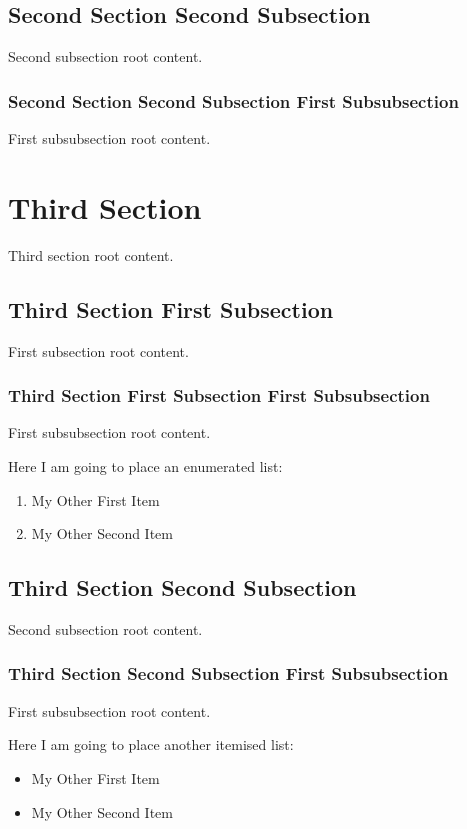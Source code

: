 \documentclass[12pt,twocolumn,a4paper,twoside]{article}
\begin{document}
\subsection{Second Section Second Subsection}
Second subsection root content.
\subsubsection{Second Section Second Subsection First Subsubsection}
First subsubsection root content.
\section{Third Section}
Third section root content.
\subsection{Third Section First Subsection}
First subsection root content.
\subsubsection{Third Section First Subsection First Subsubsection}
First subsubsection root content.

Here I am going to place an enumerated list:

\begin{enumerate}
\item My Other First Item
\item My Other Second Item
\end{enumerate}

\subsection{Third Section Second Subsection}
Second subsection root content.
\subsubsection{Third Section Second Subsection First Subsubsection}
First subsubsection root content.

Here I am going to place another itemised list:

\begin{itemize}
\item My Other First Item
\item My Other Second Item
\end{itemize}
\end{document}
